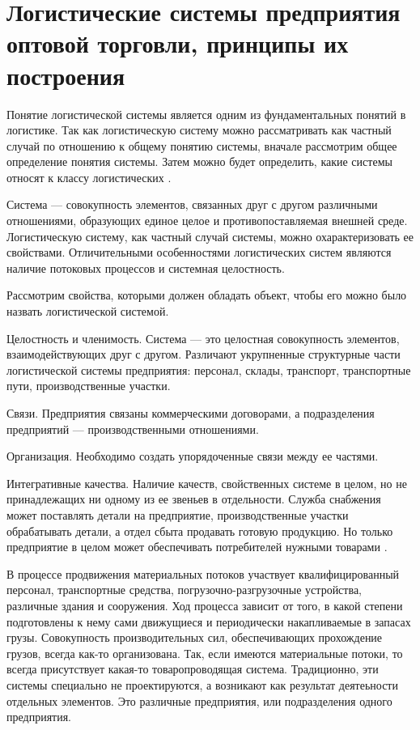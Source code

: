 \section{Логистические системы предприятия оптовой торговли, принципы их построения}

Понятие логистической системы является одним из фундаментальных понятий в логистике.
Так как логистическую систему можно рассматривать как частный случай по отношению к общему понятию системы, вначале рассмотрим общее определение понятия системы.
Затем можно будет определить, какие системы относят к классу логистических \cite[с. 82]{gadzhinskiy}.

Система --- совокупность элементов, связанных друг с другом различными отношениями, образующих единое целое и противопоставляемая внешней среде.
Логистическую систему, как частный случай системы, можно охарактеризовать ее свойствами.
Отличительными особенностями логистических систем являются наличие потоковых процессов и системная целостность.

Рассмотрим свойства, которыми должен обладать объект, чтобы его можно было назвать логистической системой.

Целостность и членимость. Система --- это целостная совокупность элементов, взаимодействующих друг с другом.
Различают укрупненные структурные части логистической системы предприятия: персонал, склады, транспорт, транспортные пути, производственные участки.

Связи. Предприятия связаны коммерческими договорами, а подразделения предприятий --- производственными отношениями.

Организация. Необходимо создать упорядоченные связи между ее частями.

Интегративные качества. Наличие качеств, свойственных системе в целом, но не принадлежащих ни одному из ее звеньев в отдельности.
Служба снабжения может поставлять детали на предприятие, производственные участки обрабатывать детали, а отдел сбыта продавать готовую продукцию.
Но только предприятие в целом может обеспечивать потребителей нужными товарами \cites[с. 114-115]{levkin}[с. 83]{gadzhinskiy}.

В процессе продвижения материальных потоков участвует квалифицированный персонал, транспортные средства, погрузочно-разгрузочные устройства, различные здания и сооружения.
Ход процесса зависит от того, в какой степени подготовлены к нему сами движущиеся и периодически накапливаемые в запасах грузы.
Совокупность производительных сил, обеспечивающих прохождение грузов, всегда как-то организована.
Так, если имеются материальные потоки, то всегда присутствует какая-то товаропроводящая система.
Традиционно, эти системы специально не проектируются, а возникают как результат деятеьности отдельных элементов.
Это различные предприятия, или подразделения одного предприятия.

